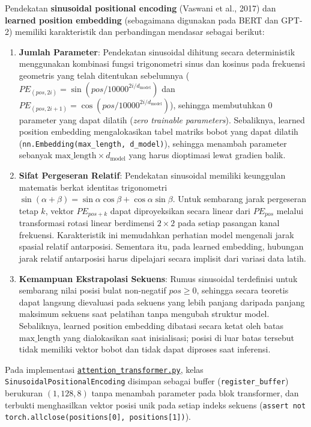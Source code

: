 \documentclass[12pt,a4paper]{article}
\newcommand{\code}[1]{\texttt{\small #1}}
\newcommand{\sourcecodelink}{\href{https://github.com/Universitas-Cakrawala/tugas-deep-learning-sesi-10/blob/main/attention_transformer.py}{\nolinkurl{attention_transformer.py}}}
\begin{document}
Pendekatan \textbf{sinusoidal positional encoding} (Vaswani et al., 2017) dan \textbf{learned position embedding} (sebagaimana digunakan pada BERT dan GPT-2) memiliki karakteristik dan perbandingan mendasar sebagai berikut:
\begin{enumerate}
    \item \textbf{Jumlah Parameter}: Pendekatan sinusoidal dihitung secara deterministik menggunakan kombinasi fungsi trigonometri sinus dan kosinus pada frekuensi geometris yang telah ditentukan sebelumnya ($PE_{(pos, 2i)} = \sin(pos / 10000^{2i/d_{\text{model}}})$ dan $PE_{(pos, 2i+1)} = \cos(pos / 10000^{2i/d_{\text{model}}})$), sehingga membutuhkan $0$ parameter yang dapat dilatih (\emph{zero trainable parameters}). Sebaliknya, learned position embedding mengalokasikan tabel matriks bobot yang dapat dilatih (\texttt{nn.Embedding(max\_length, d\_model)}), sehingga menambah parameter sebanyak $\text{max\_length} \times d_{\text{model}}$ yang harus dioptimasi lewat gradien balik.
    \item \textbf{Sifat Pergeseran Relatif}: Pendekatan sinusoidal memiliki keunggulan matematis berkat identitas trigonometri $\sin(\alpha + \beta) = \sin\alpha\cos\beta + \cos\alpha\sin\beta$. Untuk sembarang jarak pergeseran tetap $k$, vektor $PE_{pos+k}$ dapat diproyeksikan secara linear dari $PE_{pos}$ melalui transformasi rotasi linear berdimensi $2 \times 2$ pada setiap pasangan kanal frekuensi. Karakteristik ini memudahkan perhatian model mengenali jarak spasial relatif antarposisi. Sementara itu, pada learned embedding, hubungan jarak relatif antarposisi harus dipelajari secara implisit dari variasi data latih.
    \item \textbf{Kemampuan Ekstrapolasi Sekuens}: Rumus sinusoidal terdefinisi untuk sembarang nilai posisi bulat non-negatif $pos \ge 0$, sehingga secara teoretis dapat langsung dievaluasi pada sekuens yang lebih panjang daripada panjang maksimum sekuens saat pelatihan tanpa mengubah struktur model. Sebaliknya, learned position embedding dibatasi secara ketat oleh batas $\text{max\_length}$ yang dialokasikan saat inisialisasi; posisi di luar batas tersebut tidak memiliki vektor bobot dan tidak dapat diproses saat inferensi.
\end{enumerate}
Pada implementasi \sourcecodelink, kelas \code{SinusoidalPositionalEncoding}
disimpan sebagai buffer (\texttt{register\_buffer}) berukuran $(1, 128, 8)$
tanpa menambah parameter pada blok transformer, dan terbukti menghasilkan
vektor posisi unik pada setiap indeks sekuens
(\code{assert not torch.allclose(positions[0], positions[1])}).
\end{document}
